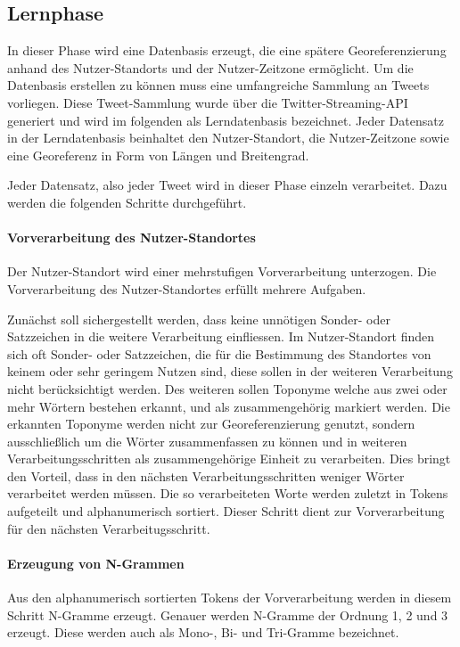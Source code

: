 	\subsection{Lernphase}
	In dieser Phase wird eine Datenbasis erzeugt, die eine spätere Georeferenzierung anhand des Nutzer-Standorts und der Nutzer-Zeitzone ermöglicht. 
	Um die Datenbasis erstellen zu können muss eine umfangreiche Sammlung an Tweets vorliegen.
	Diese Tweet-Sammlung wurde über die Twitter-Streaming-API generiert und wird im folgenden als Lerndatenbasis bezeichnet. 
	Jeder Datensatz in der Lerndatenbasis beinhaltet den Nutzer-Standort, die Nutzer-Zeitzone sowie eine Georeferenz in Form von Längen und Breitengrad.
	
	Jeder Datensatz, also jeder Tweet wird in dieser Phase einzeln verarbeitet. 
	Dazu werden die folgenden Schritte durchgeführt.

	\paragraph{Vorverarbeitung des Nutzer-Standortes} 


	Der Nutzer-Standort wird einer mehrstufigen Vorverarbeitung unterzogen.
	Die Vorverarbeitung des Nutzer-Standortes erfüllt mehrere Aufgaben. 

	Zunächst soll sichergestellt werden, dass keine unnötigen Sonder- oder Satzzeichen in die weitere Verarbeitung einfliessen. 
	Im Nutzer-Standort finden sich oft Sonder- oder Satzzeichen, die für die Bestimmung des Standortes von keinem oder sehr geringem Nutzen sind, diese sollen in der weiteren Verarbeitung nicht berücksichtigt werden.
  	Des weiteren sollen Toponyme welche aus zwei oder mehr Wörtern bestehen  erkannt, und als zusammengehörig markiert werden.
  	Die erkannten Toponyme werden nicht zur Georeferenzierung genutzt, sondern ausschließlich um die Wörter zusammenfassen zu können und in weiteren Verarbeitungsschritten als zusammengehörige Einheit zu verarbeiten.
  	Dies bringt den Vorteil, dass in den nächsten Verarbeitungsschritten weniger Wörter verarbeitet werden müssen.
  	Die so verarbeiteten Worte werden zuletzt in Tokens aufgeteilt und alphanumerisch sortiert. 
  	Dieser Schritt dient zur Vorverarbeitung für den nächsten Verarbeitugsschritt.

  	\paragraph{Erzeugung von N-Grammen}
  	Aus den alphanumerisch sortierten Tokens der Vorverarbeitung werden in diesem Schritt N-Gramme erzeugt.
  	Genauer werden N-Gramme der Ordnung 1, 2 und 3 erzeugt.
  	Diese werden auch als Mono-, Bi- und Tri-Gramme bezeichnet.  

